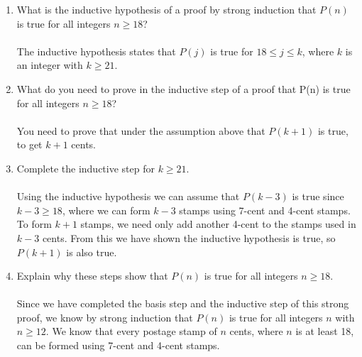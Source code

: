 \documentclass[12pt]{article}
\begin{document}
\begin{enumerate}
\begin{enumerate}
	\item What is the inductive hypothesis of a proof by strong
	induction that $P(n)$ is true for all integers $n \geq 18$?\\
    \\The inductive hypothesis states that $P(j)$ is true for $18 \leq j \leq k$, where $k$ is an integer with $k \geq 21$.\\
	\item What do you need to prove in the inductive step of a proof that P(n) is true for all integers $n \geq 18$?\\
    \\You need to prove that under the assumption above that $P(k+1)$ is true, to get $k + 1$ cents.\\
	\item Complete the inductive step for $k \geq 21.$\\
    \\Using the inductive hypothesis we can assume that $P(k - 3)$ is true since $k - 3 \geq 18$, where we can form $k - 3$ stamps using 7-cent and 4-cent stamps. To form $k + 1$ stamps, we need only add another 4-cent to the stamps used in $k - 3$ cents. From this we have shown the inductive hypothesis is true, so $P(k+1)$ is also true.\\
	\item Explain why these steps show that $P(n)$ is true for all integers $n \geq 18.$\\
    \\Since we have completed the basis step and the inductive step of this strong proof, we know by strong induction that $P(n)$ is true for all integers $n$ with $n \geq 12$. We know that every postage stamp of $n$ cents, where $n$ is at least 18, can be formed using 7-cent and 4-cent stamps.
\end{enumerate}

\end{enumerate}
\end{document}
